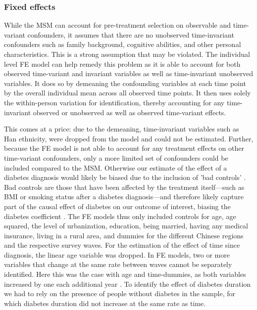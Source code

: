 \subsubsection*{Fixed effects}

While the \ac{MSM} can account for pre-treatment selection on observable and time-variant confounders, it assumes that there are no unobserved time-invariant confounders such as family background, cognitive abilities, and other personal characteristics. This is a strong assumption that may be violated. The individual level \ac{FE} model can help remedy this problem as it is able to account for both observed time-variant and invariant variables as well as time-invariant unobserved variables. It does so by demeaning the confounding variables at each time point by the overall individual mean across all observed time points. It then uses solely the within-person variation for identification, thereby accounting for any time-invariant observed or unobserved as well as observed time-variant effects. 

This comes at a price: due to the demeaning, time-invariant variables such as Han ethnicity, were dropped from the model and could not be estimated. Further, because the \ac{FE} model is not able to account for any treatment effects on other time-variant confounders, only a more limited set of confounders could be included compared to the \ac{MSM}. Otherwise our estimate of the effect of a diabetes diagnosis would likely be biased due to the inclusion of 'bad controls' \parencite{Angrist2009a}. Bad controls are those that have been affected by the treatment itself---such as \ac{BMI} or smoking status after a diabetes diagnosis---and therefore likely capture part of the causal effect of diabetes on our outcome of interest, biasing the diabetes coefficient \parencite{Angrist2009a}. The \ac{FE} models thus only included controls for age, age squared, the level of urbanization, education, being married, having any medical insurance, living in a rural area, and dummies for the different Chinese regions and the respective survey waves. For the estimation of the effect of time since diagnosis, the linear age variable was dropped. In \ac{FE} models, two or more variables that change at the same rate between waves cannot be separately identified. Here this was the case with age and time-dummies, as both variables increased by one each additional year \parencite{Wooldridge2012}. To identify the effect of diabetes duration we had to rely on the presence of people without diabetes in the sample, for which diabetes duration did not increase at the same rate as time.

